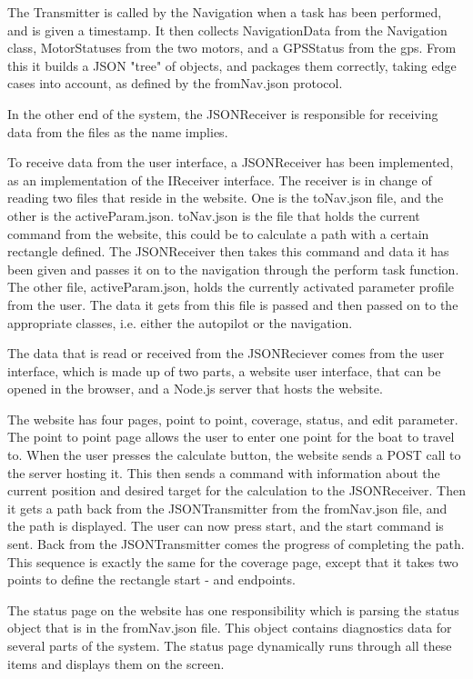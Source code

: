 The Transmitter is called by the Navigation when a task has been performed, and is given a timestamp. It then collects NavigationData from the Navigation class, MotorStatuses from the two motors, and a GPSStatus from the gps. From this it builds a JSON "tree" of objects, and packages them correctly, taking edge cases into account, as defined by the fromNav.json protocol. 

In the other end of the system, the JSONReceiver is responsible for receiving data from the files as the name implies.

To receive data from the user interface, a JSONReceiver has been implemented, as an implementation of the IReceiver interface. The receiver is in change of reading two files that reside in the website. One is the toNav.json file, and the other is the activeParam.json. toNav.json is the file that holds the current command from the website, this could be to calculate a path with a certain rectangle defined. The JSONReceiver then takes this command and data it has been given and passes it on to the navigation through the perform task function. The other file, activeParam.json, holds the currently activated parameter profile from the user. The data it gets from this file is passed and then passed on to the appropriate classes, i.e. either the autopilot or the navigation.

The data that is read or received from the JSONReciever comes from the user interface, which is made up of two parts, a website user interface, that can be opened in the browser, and a Node.js server that hosts the website. 

The website has four pages, point to point, coverage, status, and edit parameter. The point to point page allows the user to enter one point for the boat to travel to. When the user presses the calculate button, the website sends a POST call to the server hosting it. This then sends a command with information about the current position and desired target for the calculation to the JSONReceiver. Then it gets a path back from the JSONTransmitter from the fromNav.json file, and the path is displayed. The user can now press start, and the start command is sent. Back from the JSONTransmitter comes the progress of completing the path. This sequence is exactly the same for the coverage page, except that it takes two points to define the rectangle start - and endpoints. 

The status page on the website has one responsibility which is parsing the status object that is in the fromNav.json file. This object contains diagnostics data for several parts of the system. The status page dynamically runs through all these items and displays them on the screen.


